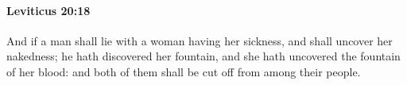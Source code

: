 
		\paragraph{Leviticus 20:18} %
			\label{LEVITICUS-20-18}

			And if a man shall lie with a woman having her sickness, and shall uncover her nakedness; he hath discovered her fountain, and she hath uncovered the fountain of her blood: and both of them shall be cut off from among their people.


